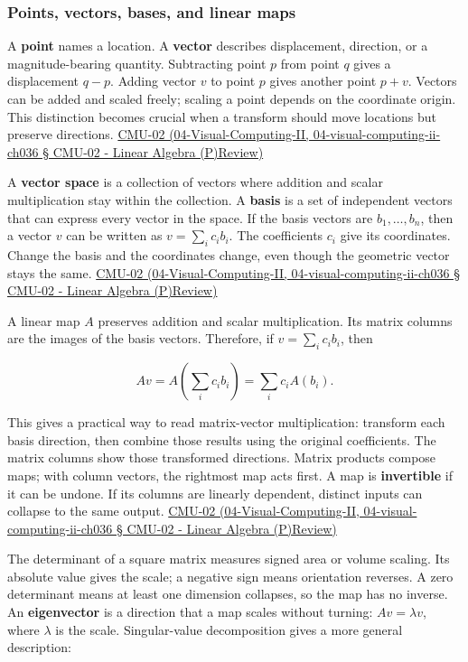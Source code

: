 \subsubsection{Points, vectors, bases, and linear maps}\label{points-vectors-bases-and-linear-maps}

A \textbf{point} names a location. A \textbf{vector} describes displacement, direction, or a magnitude-bearing quantity. Subtracting point \(p\) from point \(q\) gives a displacement \(q-p\). Adding vector \(v\) to point \(p\) gives another point \(p+v\). Vectors can be added and scaled freely; scaling a point depends on the coordinate origin. This distinction becomes crucial when a transform should move locations but preserve directions. \href{}{CMU-02 (04-Visual-Computing-II, 04-visual-computing-ii-ch036 § CMU-02 - Linear Algebra (P)Review)}

A \textbf{vector space} is a collection of vectors where addition and scalar multiplication stay within the collection. A \textbf{basis} is a set of independent vectors that can express every vector in the space. If the basis vectors are \(b_1,\ldots,b_n\), then a vector \(v\) can be written as \(v=\sum_i c_i b_i\). The coefficients \(c_i\) give its coordinates. Change the basis and the coordinates change, even though the geometric vector stays the same. \href{}{CMU-02 (04-Visual-Computing-II, 04-visual-computing-ii-ch036 § CMU-02 - Linear Algebra (P)Review)}

A linear map \(A\) preserves addition and scalar multiplication. Its matrix columns are the images of the basis vectors. Therefore, if \(v=\sum_i c_i b_i\), then

\[
Av=A\left(\sum_i c_i b_i\right)=\sum_i c_iA(b_i).
\]

This gives a practical way to read matrix-vector multiplication: transform each basis direction, then combine those results using the original coefficients. The matrix columns show those transformed directions. Matrix products compose maps; with column vectors, the rightmost map acts first. A map is \textbf{invertible} if it can be undone. If its columns are linearly dependent, distinct inputs can collapse to the same output. \href{}{CMU-02 (04-Visual-Computing-II, 04-visual-computing-ii-ch036 § CMU-02 - Linear Algebra (P)Review)}

The determinant of a square matrix measures signed area or volume scaling. Its absolute value gives the scale; a negative sign means orientation reverses. A zero determinant means at least one dimension collapses, so the map has no inverse. An \textbf{eigenvector} is a direction that a map scales without turning: \(Av=\lambda v\), where \(\lambda\) is the scale. Singular-value decomposition gives a more general description:

